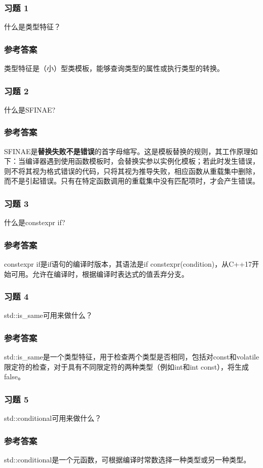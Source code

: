 \subsubsection{习题 1}

什么是类型特征？

\subsubsection{参考答案}

类型特征是（小）型类模板，能够查询类型的属性或执行类型的转换。


\subsubsection{习题 2}

什么是SFINAE?

\subsubsection{参考答案}

SFINAE是\textbf{替换失败不是错误}的首字母缩写。这是模板替换的规则，其工作原理如下：当编译器遇到使用函数模板时，会替换实参以实例化模板；若此时发生错误，则不将其视为格式错误的代码，只将其视为推导失败，相应函数从重载集中删除，而不是引起错误。只有在特定函数调用的重载集中没有匹配项时，才会产生错误。

\subsubsection{习题 3}

什么是constexpr if?

\subsubsection{参考答案}

constexpr if是if语句的编译时版本，其语法是if constexpr(condition)，从C++17开始可用。允许在编译时，根据编译时表达式的值丢弃分支。

\subsubsection{习题 4}

std::is\_same可用来做什么？

\subsubsection{参考答案}

std::is\_same是一个类型特征，用于检查两个类型是否相同，包括对const和volatile限定符的检查，对于具有不同限定符的两种类型（例如int和int const），将生成false。

\subsubsection{习题 5}

std::conditional可用来做什么？

\subsubsection{参考答案}

std::conditional是一个元函数，可根据编译时常数选择一种类型或另一种类型。












